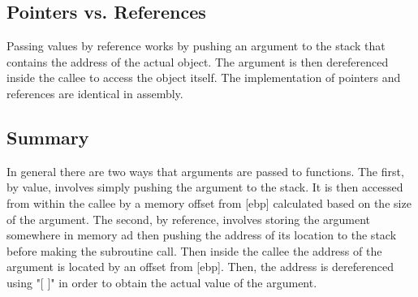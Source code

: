 \documentclass{article}
\begin{document}
\subsection{Pointers vs. References}
Passing values by reference works by pushing an argument to the stack that contains the address of the actual object. The argument is then dereferenced inside the callee to access the object itself. The implementation of pointers and references are identical in assembly. 

\subsection{Summary}
In general there are two ways that arguments are passed to functions. The first, by value, involves simply pushing the argument to the stack. It is then accessed from within the callee by a memory offset from [ebp] calculated based on the size of the argument. The second, by reference, involves storing the argument somewhere in memory ad then pushing the address of its location to the stack before making the subroutine call. Then inside the callee the address of the argument is located by an offset from [ebp]. Then, the address is dereferenced using "[ ]" in order to obtain the actual value of the argument.
\end{document}
